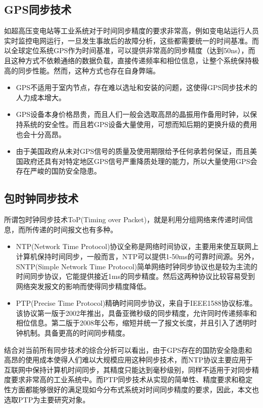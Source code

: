 \subsection{GPS同步技术}
如超高压变电站等工业系统对于时间同步精度的要求非常高，例如变电站运行人员实时监控电网运行，一旦发生事故后的故障分析，这些都需要统一的时间基准。而以全球定位系统GPS作为时间基准，可以提供非常高的同步精度（达到50ns），而且这种方式不依赖通络的数据负载，直接传递频率和相位信息，让整个系统保持极高的同步性能。然而，这种方式也存在自身弊端。
\begin{itemize}[noitemsep,topsep=0pt,parsep=0pt,partopsep=0pt]
	\item GPS不适用于室内节点，存在难以选址和安装的问题，这使得GPS同步技术的人力成本增大。
	\item GPS设备本身价格昂贵，而且人们一般会选取高昂的晶振用作备用时钟，以保持系统的安全性。而且若GPS设备大量使用，可想而知后期的更换升级的费用也会十分高昂。
	\item 由于美国政府从未对GPS信号的质量及使用期限给予任何承若何保证，而且美国政府还具有对特定地区GPS信号严重降质处理的能力，所以大量使用GPS会存在严峻的国防安全隐患。
\end{itemize}

\subsection{包时钟同步技术}
所谓包时钟同步技术ToP(Timing over Packet)，就是利用分组网络来传递时间信息，而所传递的时间报文也有多种。
\begin{itemize}[noitemsep,topsep=0pt,parsep=0pt,partopsep=0pt]
	\item  NTP(Network Time Protocol)协议全称是网络时间协议，主要用来使互联网上计算机保持时间同步，一般而言，NTP可以提供1-50ms的可靠时间源。另外，SNTP(Simple Network Time Protocol)简单网络时钟同步协议也是较为主流的时间同步协议，它能提供接近1ms的同步精度。然后这两种协议比较容易受到网络突发报文的影响而使得同步精度降低。
	\item PTP(Precise Time Protocol)精确时间同步协议，来自于IEEE1588协议标准\supercite{2}。该协议第一版于2002年推出，具备亚微秒级的同步精度，允许同时传递频率和相位信息。第二版于2008年公布，缩短并统一了报文长度，并且引入了透明时钟机制。具备更高的时间同步精度。
\end{itemize}

结合对当前所有同步技术的综合分析可以看出，由于GPS存在的国防安全隐患和高昂的使用成本使得人们难以大规模应用这种同步技术，而NTP协议主要应用于互联网中保持计算机时间同步，其精度只能达到毫秒级别，同样不适用于对同步精度要求非常高的工业系统中。而PTP同步技术从实现的简单性、精度要求和稳定性方面都能够很好的满足现如今分布式系统对时间同步精度的要求，因此，本文也选取PTP为主要研究对象。

